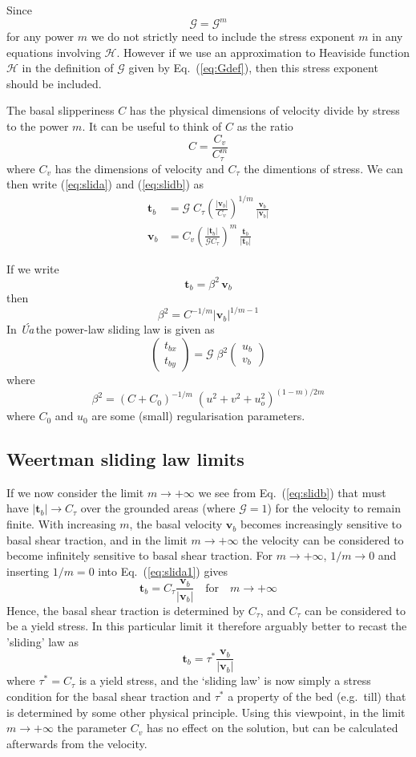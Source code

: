 \documentclass[10pt,a4paper]{book}
\newcommand{\He}{\mathcal{H}}
\newcommand{\G}{\mathcal{G}}
\newcommand{\Ua}{\textsl{\'Ua}\,}
\begin{document}
Since
\[
\G=\G^m
\]
for any power $m$ we do not strictly need to include the stress
exponent $m$ in any equations involving $\He$. However if we use an
approximation to Heaviside function $\He$ in the definition of $\G$
given by Eq.~(\ref{eq:Gdef}), then this stress exponent should be
included.

The basal slipperiness $C$ has the physical dimensions of velocity divide by
stress to the power $m$. It can be useful to think of $C$ as the ratio
\[
C= \frac{C_v}{C_{\tau}^m}
\]
where $C_v$ has the dimensions of velocity and $C_{\tau}$ the
dimentions of stress.  We can then write (\ref{eq:slida}) and
(\ref{eq:slidb}) as
\begin{align}
  \bm{t}_b   & = \G \; C_{\tau} \left ( \frac{| \bm{v}_b|}{C_v} \right )^{1/m} \, \frac{\bm{v}_b}{| \bm{v}_b | } \label{eq:slida1} \\
  \bm{v}_b   & =  C_v  \left ( \frac{ | \bm{t}_b|}{\G C_{\tau}} \right )^m \, \frac{\bm{t}_b}{| \bm{t}_b|}  \label{eq:slidb} 
\end{align}



If we write
\[ 
\bm{t}_b=\beta^2 \, \bm{v}_b
\]
then
\[
\beta^2=C^{-1/m} | \bm{v}_b|^{1/m-1} 
\]
In  \Ua the power-law sliding law is given as
\[
  \begin{pmatrix}  t_{bx} \\ t_{by}  \end{pmatrix} 
=\G \; \beta^2    \begin{pmatrix}  u_b \\ v_b  \end{pmatrix} 
\]
where
\[
\beta^2=(C+C_0)^{-1/m} \; (u^2+v^2+u_o^2)^{(1-m)/2m}
\]
where $C_0$ and $u_0$ are some (small) regularisation parameters. 


\subsection{Weertman sliding law limits}
If we now consider the limit $m \to +\infty$ we see from
Eq.~(\ref{eq:slidb}) that must have $|\bm{t}_b| \to C_{\tau}$ over the
grounded areas (where $\G=1$) for the velocity to remain finite.  With
increasing $m$, the basal velocity $\bm{v}_b$ becomes increasingly
sensitive to basal shear traction, and in the limit $m \to + \infty$
the velocity can be considered to become infinitely sensitive to basal
shear traction.  For $m \to +\infty$, $1/m \to 0$ and inserting
$1/m=0$ into Eq.~(\ref{eq:slida1}) gives
\[ 
     \bm{t}_b =  C_{\tau} \frac{\bm{v}_b}{| \bm{v}_b | }  \quad \text{for}   \quad m \to +\infty 
     \]
Hence, the basal shear traction is determined by $C_{\tau}$, and
$C_{\tau}$ can be considered to be a yield stress. In this particular
limit it therefore arguably better to recast the 'sliding' law as
\[
\bm{t}_b=  \tau^* \frac{\bm{v}_b}{| \bm{v}_b | }
\]
where $\tau^*=C_{\tau}$ is a yield stress, and the `sliding law' is
now simply a stress condition for the basal shear traction and
$\tau^*$ a property of the bed (e.g.\ till) that is determined by some
other physical principle.  Using this viewpoint, in the limit $m\to
+\infty$ the parameter $C_v$ has no effect on the solution, but can be
calculated afterwards from the velocity.
\end{document}
